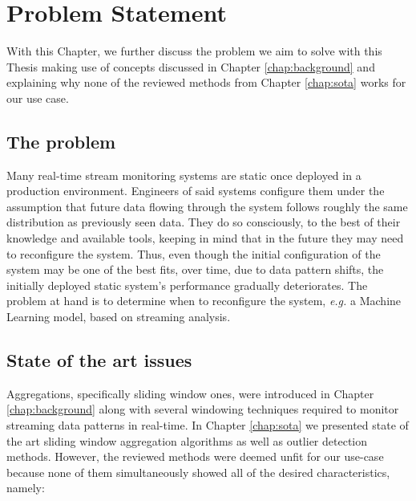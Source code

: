 \chapter{Problem Statement} \label{chap:statement} \minitoc

With this Chapter, we further discuss the problem we aim to solve with this Thesis making use of concepts discussed in Chapter \ref{chap:background} and explaining why none of the reviewed methods from Chapter \ref{chap:sota} works for our use case.

\section{The problem}
Many real-time stream monitoring systems are static once deployed in a production environment. Engineers of said systems configure them under the assumption that future data flowing through the system follows roughly the same distribution as previously seen data. They do so consciously, to the best of their knowledge and available tools, keeping in mind that in the future they may need to reconfigure the system. Thus, even though the initial configuration of the system may be one of the best fits, over time, due to data pattern shifts, the initially deployed static system's performance gradually deteriorates. The problem at hand is to determine when to reconfigure the system, \textit{e.g.} a Machine Learning model, based on streaming analysis.

\section{State of the art issues}
Aggregations, specifically sliding window ones, were introduced in Chapter \ref{chap:background} along with several windowing techniques required to monitor streaming data patterns in real-time. In Chapter \ref{chap:sota} we presented state of the art sliding window aggregation algorithms as well as outlier detection methods. However, the reviewed methods were deemed unfit for our use-case because none of them simultaneously showed all of the desired characteristics, namely:

